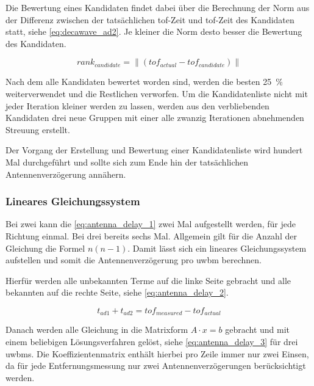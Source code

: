 Die Bewertung eines Kandidaten findet dabei über die Berechnung der Norm aus der Differenz zwischen der tatsächlichen \Gls{tof}-Zeit und \Gls{tof}-Zeit des Kandidaten statt, siehe \autoref{eq:decawave_ad2}. Je kleiner die Norm desto besser die Bewertung des Kandidaten.

\begin{equation}
rank_{candidate}=\lVert (tof_{actual} - tof_{candidate}) \lVert\label{eq:decawave_ad2}
\end{equation}

Nach dem alle Kandidaten bewertet worden sind, werden die besten \SI{25}{\percent} weiterverwendet und die Restlichen verworfen. Um die Kandidatenliste nicht mit jeder Iteration kleiner werden zu lassen, werden aus den verbliebenden Kandidaten drei neue Gruppen mit einer alle zwanzig Iterationen abnehmenden Streuung erstellt.

Der Vorgang der Erstellung und Bewertung einer Kandidatenliste wird hundert Mal durchgeführt und sollte sich zum Ende hin der tatsächlichen Antennenverzögerung annähern.


%
%
%
\subsubsection{Lineares Gleichungssystem}

Bei zwei  kann die \autoref{eq:antenna_delay_1} zwei Mal aufgestellt werden, für jede Richtung einmal. Bei drei  bereits sechs Mal. Allgemein gilt für die Anzahl der Gleichung die Formel $n(n-1)$. Damit lässt sich ein lineares Gleichungssystem aufstellen und somit die Antennenverzögerung pro \Gls{uwbm} berechnen.

Hierfür werden alle unbekannten Terme auf die linke Seite gebracht und alle bekannten auf die rechte Seite, siehe \autoref{eq:antenna_delay_2}.

\begin{equation}
t_{ad1} + t_{ad2} = tof_{measured} - tof_{actual} \label{eq:antenna_delay_2}
\end{equation}

Danach werden alle Gleichung in die Matrixform $A\cdot x=b$ gebracht und mit einem beliebigen Lösungsverfahren gelöst, siehe \autoref{eq:antenna_delay_3} für drei \Glspl{uwbm}. Die Koeffizientenmatrix enthält hierbei pro Zeile immer nur zwei Einsen, da für jede Entfernungsmessung nur zwei Antennenverzögerungen berücksichtigt werden.

